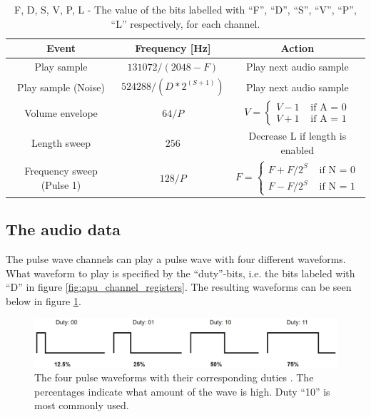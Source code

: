 \begin{table}[H]
    \centering
    \begin{tabular}{|c|c|c|}
        \hline
        \textbf{Event} & \textbf{Frequency [Hz]} & \textbf{Action} \\
        \hline
        Play sample & $131072/(2048 - F)$ & Play next audio sample \\
        \hline
        Play sample (Noise) & $524288 / (D * 2 ^ {(S + 1)})$ & Play next audio sample \\
        \hline
        Volume envelope & $64/P$ & 
        $V =
        \begin{cases}
            V - 1  & \text{ if A = 0} \\
            V + 1 & \text{ if A = 1}
        \end{cases}$ \\
        \hline
        Length sweep & $256$ & Decrease L if length is enabled\\
        \hline
        Frequency sweep (Pulse 1) & $128/P$ &
        $F =
        \begin{cases}
            F + F/2^{S}  & \text{ if N = 0} \\
            F - F/2^{S} & \text{ if N = 1}
        \end{cases}$\\
        \hline
    \end{tabular}
    \caption{F, D, S, V, P, L - The value of the bits labelled with ``F'', ``D'', ``S'', ``V'', ``P'', ``L'' respectively, for each channel.}
    \label{tab:frequent_events_apu}
    
\end{table}
        
\subsection{The audio data} \label{sec:theAudioData}
    The pulse wave channels can play a pulse wave with four different waveforms. What waveform to play is specified by the ``duty''-bits, i.e. the bits labeled with ``D'' in figure \ref{fig:apu_channel_registers}. The resulting waveforms can be seen below in figure \ref{fig:square_wave_forms}.
        
\begin{figure}[H]
    \centering
    \includegraphics[width=\textwidth]{figures/APU/square_waveforms.png}
    \caption{The four pulse waveforms with their corresponding duties \cite{AudioHardware}. The percentages indicate what amount of the wave is high. Duty ``10'' is most commonly used.}
    \label{fig:square_wave_forms}
\end{figure}

